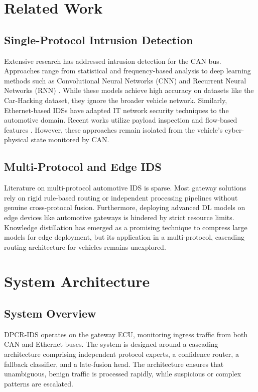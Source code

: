 \documentclass[conference]{IEEEtran}
\begin{document}
\section{Related Work}
\subsection{Single-Protocol Intrusion Detection}
Extensive research has addressed intrusion detection for the CAN bus. Approaches range from statistical and frequency-based analysis to deep learning methods such as Convolutional Neural Networks (CNN) and Recurrent Neural Networks (RNN) \cite{can_dl}. While these models achieve high accuracy on datasets like the Car-Hacking dataset, they ignore the broader vehicle network.
Similarly, Ethernet-based IDSs have adapted IT network security techniques to the automotive domain. Recent works utilize payload inspection and flow-based features \cite{eth_ids}. However, these approaches remain isolated from the vehicle's cyber-physical state monitored by CAN.

\subsection{Multi-Protocol and Edge IDS}
Literature on multi-protocol automotive IDS is sparse. Most gateway solutions rely on rigid rule-based routing or independent processing pipelines without genuine cross-protocol fusion. Furthermore, deploying advanced DL models on edge devices like automotive gateways is hindered by strict resource limits. Knowledge distillation has emerged as a promising technique to compress large models for edge deployment, but its application in a multi-protocol, cascading routing architecture for vehicles remains unexplored.

\section{System Architecture}

\subsection{System Overview}
DPCR-IDS operates on the gateway ECU, monitoring ingress traffic from both CAN and Ethernet buses. The system is designed around a cascading architecture comprising independent protocol experts, a confidence router, a fallback classifier, and a late-fusion head. The architecture ensures that unambiguous, benign traffic is processed rapidly, while suspicious or complex patterns are escalated.
\end{document}
